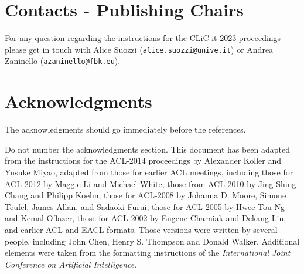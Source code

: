 \documentclass[11pt]{article}
\begin{document}
\section{Contacts - Publishing Chairs}
For any question regarding the instructions for the CLiC-it 2023 proceedings please get in touch with Alice Suozzi (\texttt{alice.suozzi@unive.it}) or Andrea Zaninello (\texttt{azaninello@fbk.eu}).


\section*{Acknowledgments}

The acknowledgments should go immediately before the references.

Do not number the acknowledgments section. This document has been adapted from the instructions for the ACL-2014 proceedings by Alexander Koller and Yusuke Miyao, adapted from those for earlier ACL meetings, including those for ACL-2012 by Maggie Li and Michael White, those from ACL-2010 by Jing-Shing Chang and Philipp Koehn, those for ACL-2008 by Johanna D. Moore, Simone Teufel, James Allan, and Sadaoki Furui, those for ACL-2005 by Hwee Tou Ng and Kemal Oflazer, those for ACL-2002 by Eugene Charniak and Dekang Lin, and earlier ACL and EACL formats. Those versions were written by several people, including John Chen, Henry S. Thompson and Donald Walker. Additional elements were taken from the formatting instructions of the {\em International Joint Conference on Artificial Intelligence}.



\end{document}
